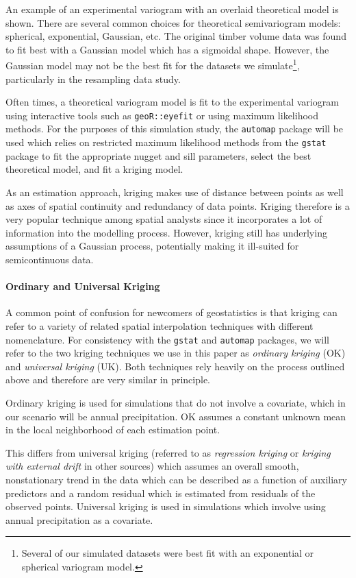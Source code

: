 \documentclass{article}
\begin{document}
An example of an experimental variogram with an overlaid theoretical model is shown.
There are several common choices for theoretical semivariogram models: spherical, exponential, Gaussian, etc.
The original timber volume data was found to fit best with a Gaussian model which has a sigmoidal shape.
However, the Gaussian model may not be the best fit for the datasets we simulate\footnote{Several of our simulated datasets were best fit with an exponential or spherical variogram model.}, particularly in the resampling data study.

Often times, a theoretical variogram model is fit to the experimental variogram using interactive tools such as \texttt{geoR::eyefit} or using maximum likelihood methods.
For the purposes of this simulation study, the \texttt{automap} package will be used which relies on restricted maximum likelihood methods from the \texttt{gstat} package to fit the appropriate nugget and sill parameters, select the best theoretical model, and fit a kriging model.

As an estimation approach, kriging makes use of distance between points as well as axes of spatial continuity and redundancy of data points.
Kriging therefore is a very popular technique among spatial analysts since it incorporates a lot of information into the modelling process.
However, kriging still has underlying assumptions of a Gaussian process, potentially making it ill-suited for semicontinuous data.

\paragraph{Ordinary and Universal Kriging} A common point of confusion for newcomers of geostatistics is that kriging can refer to a variety of related spatial interpolation techniques with different nomenclature.
For consistency with the \texttt{gstat} and \texttt{automap} packages, we will refer to the two kriging techniques we use in this paper as \textit{ordinary kriging} (OK) and \textit{universal kriging} (UK).
Both techniques rely heavily on the process outlined above and therefore are very similar in principle.

Ordinary kriging is used for simulations that do not involve a covariate, which in our scenario will be annual precipitation.
OK assumes a constant unknown mean in the local neighborhood of each estimation point.

This differs from universal kriging (referred to as \textit{regression kriging} or \textit{kriging with external drift} in other sources) which assumes an overall smooth, nonstationary trend in the data which can be described as a function of auxiliary predictors and a random residual which is estimated from residuals of the observed points.\cite{kis15}
Universal kriging is used in simulations which involve using annual precipitation as a covariate.
\end{document}
